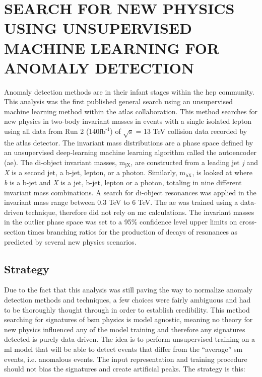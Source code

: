\begingroup
\clearpage%
\let\clearpage\relax%
\vspace*{-16pt}%
\chapter[SEARCH FOR NEW PHYSICS USING UNSUPERVISED MACHINE LEARNING FOR ANOMALY DETECTION]{SEARCH FOR NEW PHYSICS USING UNSUPERVISED MACHINE LEARNING FOR ANOMALY DETECTION}
\label{ch6}
\endgroup

Anomaly detection methods are in their infant stages within the \gls{hep} community. This analysis was the first published general search using an unsupervised machine learning method 
within the \gls{atlas} collaboration. This method searches for new physics in two-body invariant masses in events with a single isolated lepton using all data from Run 2 (140$\textrm{fb}^{\textrm{-1}}$)
of $\sqrt{\textrm{s}}$ = 13 TeV collision data recorded by the \gls{atlas} detector. The invariant mass distributions are a phase space defined by an unsupervised deep-learning machine learning 
algorithm called the autoencoder (\gls{ae}). The di-object invariant masses, $\textrm{m}_{\textrm{jX}}$, are constructed from a leading jet \textit{j} and \textit{X} is a second jet, a b-jet, 
lepton, or a photon. Similarly, $\textrm{m}_{\textrm{bX}}$, is looked at where \textit{b} is a b-jet and \textit{X} is a jet, b-jet, lepton or a photon, totaling in nine different invariant mass combinations.
A search for di-object resonances was applied in the 
invariant mass range between 0.3 TeV to 6 TeV. The \gls{ae} was trained using a data-driven technique, therefore did not rely on \gls{mc} calculations. The invariant masses in the outlier phase 
space was set to a 95\% confidence level upper limits on cross-section times branching ratios for the production of decays of resonances as predicted by several new physics scenarios.  

\section{Strategy}

Due to the fact that this analysis was still paving the way to normalize anomaly detection methods and techniques, a few choices were fairly ambiguous and had to be thoroughly thought through 
in order to establish credibility. This method searching for signatures of \gls{bsm} physics is model agnostic, meaning no theory for new physics influenced any of the model training and therefore 
any signatures detected is purely data-driven. The idea is to perform unsupervised training on a \gls{ml} model that will be able to detect events that differ from the ``average'' \gls{sm} events,
i.e. anomalous events. The input representation and training procedure should not bias the signatures and create artificial peaks. The strategy is this:

